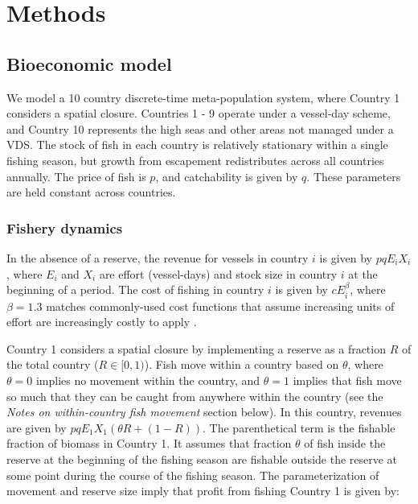\documentclass[12pt]{article}
\begin{document}
\clearpage

\section{Methods}

\subsection{Bioeconomic model}

We model a 10 country discrete-time meta-population system, where Country 1 considers a spatial closure. Countries 1 - 9 operate under a vessel-day scheme, and Country 10 represents the high seas and other areas not managed under a VDS. The stock of fish in each country is relatively stationary within a single fishing season, but  growth from escapement redistributes across all countries annually. The price of fish is $p$, and catchability is given by $q$. These parameters are held constant across countries.

\subsubsection{Fishery dynamics}

In the absence of a reserve, the revenue for vessels in country $i$ is given by $pqE_iX_i$, where $E_i$ and $X_i$ are effort (vessel-days) and stock size in country $i$ at the beginning of a period. The cost of fishing in country $i$ is given by $cE_i^\beta$, where $\beta = 1.3$ matches commonly-used cost functions that assume increasing units of effort are increasingly costly to apply \cite{costello_2016}.

Country 1 considers a spatial closure by implementing a reserve as a fraction $R$ of the total country ($R \in[0,1)$). Fish move within a country based on $\theta$, where $\theta = 0$ implies no movement within the country, and $\theta = 1$ implies that fish move so much that they can be caught from anywhere within the country (see the \emph{Notes on within-country fish movement} section below). In this country, revenues are given by $pqE_1X_1(\theta R + (1 - R))$. The parenthetical term is the fishable fraction of biomass in Country 1. It assumes that fraction $\theta$ of fish inside the reserve at the beginning of the fishing season are fishable outside the reserve at some point during the course of the fishing season. The parameterization of movement and reserve size imply that profit from fishing Country 1 is given by:
\end{document}
